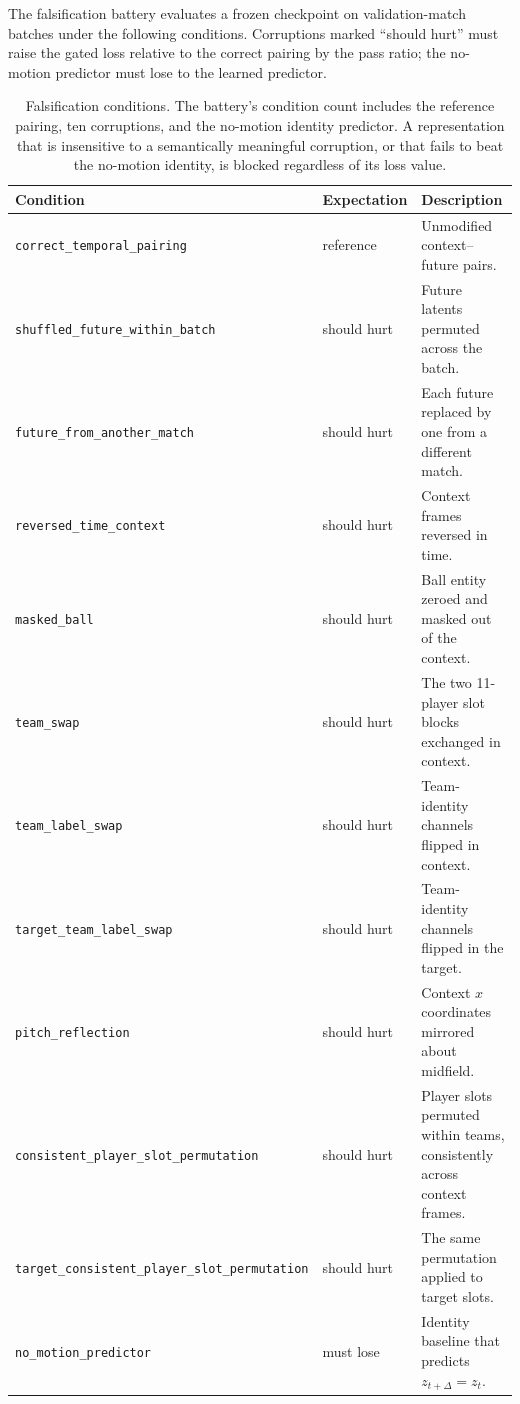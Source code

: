 The falsification battery evaluates a frozen checkpoint on validation-match
batches under the following conditions. Corruptions marked ``should hurt''
must raise the gated loss relative to the correct pairing by the pass ratio;
the no-motion predictor must lose to the learned predictor.

\begin{table}[h]
  \centering
  \small
  \begin{tabular}{llp{7.2cm}}
    \toprule
    Condition & Expectation & Description \\
    \midrule
    \texttt{correct\_temporal\_pairing} & reference & Unmodified context--future pairs. \\
    \texttt{shuffled\_future\_within\_batch} & should hurt & Future latents permuted across the batch. \\
    \texttt{future\_from\_another\_match} & should hurt & Each future replaced by one from a different match. \\
    \texttt{reversed\_time\_context} & should hurt & Context frames reversed in time. \\
    \texttt{masked\_ball} & should hurt & Ball entity zeroed and masked out of the context. \\
    \texttt{team\_swap} & should hurt & The two 11-player slot blocks exchanged in context. \\
    \texttt{team\_label\_swap} & should hurt & Team-identity channels flipped in context. \\
    \texttt{target\_team\_label\_swap} & should hurt & Team-identity channels flipped in the target. \\
    \texttt{pitch\_reflection} & should hurt & Context $x$ coordinates mirrored about midfield. \\
    \texttt{consistent\_player\_slot\_permutation} & should hurt & Player slots permuted within teams, consistently across context frames. \\
    \texttt{target\_consistent\_player\_slot\_permutation} & should hurt & The same permutation applied to target slots. \\
    \texttt{no\_motion\_predictor} & must lose & Identity baseline that predicts $z_{t+\Delta} = z_t$. \\
    \bottomrule
  \end{tabular}
  \caption{Falsification conditions. The battery's condition count includes
  the reference pairing, ten corruptions, and the no-motion identity
  predictor. A representation that is insensitive to a semantically meaningful
  corruption, or that fails to beat the no-motion identity, is blocked
  regardless of its loss value.}
  \label{tab:conditions}
\end{table}
